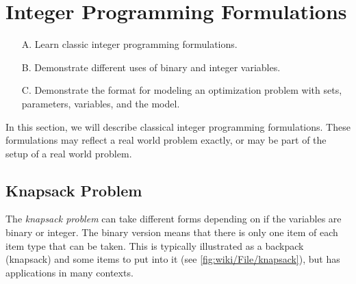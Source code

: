 


% 
%

\chapter{Integer Programming Formulations}
\label{sec:IP-formulations} 
\begin{outcome}
\begin{enumerate}
\item[A.] Learn classic integer programming formulations.
\item[B.] Demonstrate different uses of binary and integer variables.
\item[C.]  Demonstrate the format for modeling an optimization problem with sets, parameters, variables, and the model.
\end{enumerate}
\end{outcome}




In this section, we will describe classical integer programming formulations.     These formulations may reflect  a real world problem exactly, or may be part of the setup of a real world problem.   

\section{Knapsack Problem}
The \emph{knapsack problem} can take different forms depending on if the variables are binary or integer.  The binary version means that there is only one item of each item type that can be taken.  This is typically illustrated as a backpack (knapsack) and some items to put into it (see  \autoref{fig:wiki/File/knapsack}), but has applications in many contexts.  



